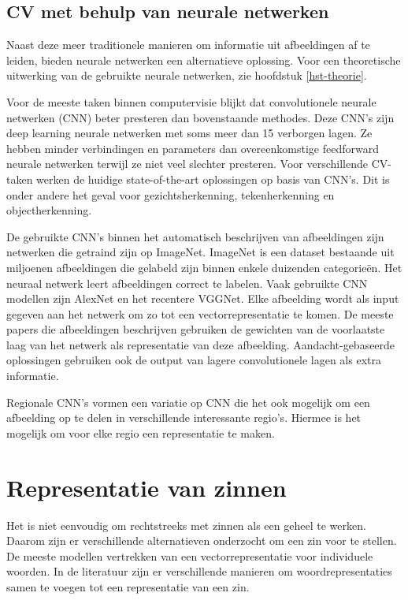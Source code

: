 \subsection{CV met behulp van neurale netwerken}
Naast deze meer traditionele manieren om informatie uit afbeeldingen af te leiden, bieden neurale netwerken een alternatieve oplossing. Voor een theoretische uitwerking van de gebruikte neurale netwerken, zie hoofdstuk \ref{hst-theorie}.

Voor de meeste taken binnen computervisie blijkt dat convolutionele neurale netwerken (CNN) beter presteren dan bovenstaande methodes. Deze CNN's zijn deep learning neurale netwerken met soms meer dan 15 verborgen lagen. Ze hebben minder verbindingen en parameters dan overeenkomstige feedforward neurale netwerken terwijl ze niet veel slechter presteren\cite{Krizhevsky2012a}. 
Voor verschillende CV-taken werken de huidige state-of-the-art oplossingen op basis van CNN's. Dit is onder andere het geval voor gezichtsherkenning\cite{Zhou2015}, tekenherkenning\cite{Ciresan2012} en objectherkenning\cite{Szegedy2014}.

De gebruikte CNN's binnen het automatisch beschrijven van afbeeldingen zijn netwerken die getraind zijn op ImageNet\cite{Russakovsky2014}. ImageNet is een dataset bestaande uit miljoenen afbeeldingen die gelabeld zijn binnen enkele duizenden categorie\"en. Het neuraal netwerk leert afbeeldingen correct te labelen. Vaak gebruikte CNN modellen zijn AlexNet\cite{Krizhevsky2012a} en het recentere VGGNet\cite{Arge2015}. Elke afbeelding wordt als input gegeven aan het netwerk om zo tot een vectorrepresentatie te komen. De meeste papers die afbeeldingen beschrijven gebruiken de gewichten van de voorlaatste laag van het netwerk als representatie van deze afbeelding\cite{Chen2014,Karpathy2015,Mao2014a,Google}. Aandacht-gebaseerde oplossingen\cite{Jin2015,Xu2015} gebruiken ook de output van lagere convolutionele lagen als extra informatie.

Regionale CNN's vormen een variatie op CNN die het ook mogelijk om een afbeelding op te delen in verschillende interessante regio's. Hiermee is het mogelijk om voor elke regio een representatie te maken\cite{Karpathy2015,Mitchell2015}. 

\section{Representatie van zinnen}
Het is niet eenvoudig om rechtstreeks met zinnen als een geheel te werken. Daarom zijn er verschillende alternatieven onderzocht om een zin voor te stellen.
De meeste modellen vertrekken van een vectorrepresentatie voor individuele woorden. In de literatuur zijn er verschillende manieren om woordrepresentaties samen te voegen tot een representatie van een zin.

